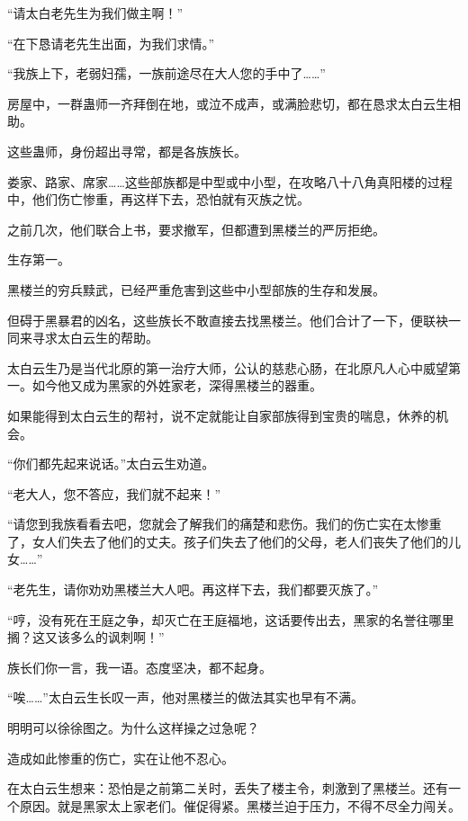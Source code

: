 
\begin{this_body}

“请太白老先生为我们做主啊！”

“在下恳请老先生出面，为我们求情。”

“我族上下，老弱妇孺，一族前途尽在大人您的手中了……”

房屋中，一群蛊师一齐拜倒在地，或泣不成声，或满脸悲切，都在恳求太白云生相助。

这些蛊师，身份超出寻常，都是各族族长。

娄家、路家、席家……这些部族都是中型或中小型，在攻略八十八角真阳楼的过程中，他们伤亡惨重，再这样下去，恐怕就有灭族之忧。

之前几次，他们联合上书，要求撤军，但都遭到黑楼兰的严厉拒绝。

生存第一。

黑楼兰的穷兵黩武，已经严重危害到这些中小型部族的生存和发展。

但碍于黑暴君的凶名，这些族长不敢直接去找黑楼兰。他们合计了一下，便联袂一同来寻求太白云生的帮助。

太白云生乃是当代北原的第一治疗大师，公认的慈悲心肠，在北原凡人心中威望第一。如今他又成为黑家的外姓家老，深得黑楼兰的器重。

如果能得到太白云生的帮衬，说不定就能让自家部族得到宝贵的喘息，休养的机会。

“你们都先起来说话。”太白云生劝道。

“老大人，您不答应，我们就不起来！”

“请您到我族看看去吧，您就会了解我们的痛楚和悲伤。我们的伤亡实在太惨重了，女人们失去了他们的丈夫。孩子们失去了他们的父母，老人们丧失了他们的儿女……”

“老先生，请你劝劝黑楼兰大人吧。再这样下去，我们都要灭族了。”

“哼，没有死在王庭之争，却灭亡在王庭福地，这话要传出去，黑家的名誉往哪里搁？这又该多么的讽刺啊！”

族长们你一言，我一语。态度坚决，都不起身。

“唉……”太白云生长叹一声，他对黑楼兰的做法其实也早有不满。

明明可以徐徐图之。为什么这样操之过急呢？

造成如此惨重的伤亡，实在让他不忍心。

在太白云生想来：恐怕是之前第二关时，丢失了楼主令，刺激到了黑楼兰。还有一个原因。就是黑家太上家老们。催促得紧。黑楼兰迫于压力，不得不尽全力闯关。


\end{this_body}
